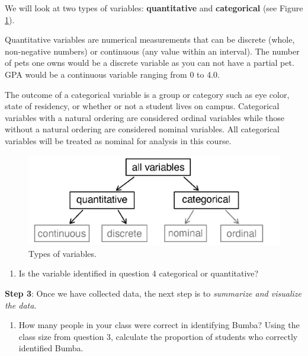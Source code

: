 \documentclass[
]{report}
\providecommand{\tightlist}{%
  \setlength{\itemsep}{0pt}\setlength{\parskip}{0pt}}
\begin{document}
\vspace{.8in}

We will look at two types of variables: \textbf{quantitative} and \textbf{categorical} (see Figure \ref{fig:types-of-variables}).

Quantitative variables are numerical measurements that can be discrete (whole, non-negative numbers) or continuous (any value within an interval). The number of pets one owns would be a discrete variable as you can not have a partial pet. GPA would be a continuous variable ranging from 0 to 4.0.

The outcome of a categorical variable is a group or category such as eye color, state of residency, or whether or not a student lives on campus. Categorical variables with a natural ordering are considered ordinal variables while those without a natural ordering are considered nominal variables. All categorical variables will be treated as nominal for analysis in this course.

\begin{figure}

{\centering \includegraphics[width=0.5\linewidth]{images/variables} 

}

\caption{Types of variables.}\label{fig:types-of-variables}
\end{figure}

\begin{enumerate}
\def\labelenumi{\arabic{enumi}.}
\setcounter{enumi}{4}
\tightlist
\item
  Is the variable identified in question 4 categorical or quantitative?
\end{enumerate}

\vspace{0.3in}

\textbf{Step 3}: Once we have collected data, the next step is to \emph{summarize and visualize the data}.

\begin{enumerate}
\def\labelenumi{\arabic{enumi}.}
\setcounter{enumi}{5}
\tightlist
\item
  How many people in your class were correct in identifying Bumba? Using the class size from question 3, calculate the proportion of students who correctly identified Bumba.
\end{enumerate}
\end{document}
